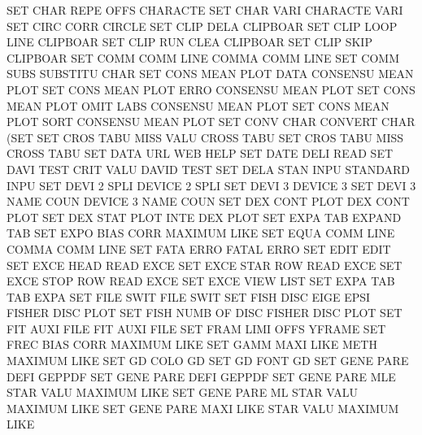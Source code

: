 SET      CHAR REPE OFFS                 CHARACTE
SET      CHAR VARI                      CHARACTE VARI
SET      CIRC CORR                      CIRCLE
SET      CLIP DELA                      CLIPBOAR
SET      CLIP LOOP LINE                 CLIPBOAR
SET      CLIP RUN  CLEA                 CLIPBOAR
SET      CLIP SKIP                      CLIPBOAR
SET      COMM COMM LINE                 COMMA    COMM LINE
SET      COMM SUBS                      SUBSTITU CHAR
SET      CONS MEAN PLOT DATA            CONSENSU MEAN PLOT
SET      CONS MEAN PLOT ERRO            CONSENSU MEAN PLOT
SET      CONS MEAN PLOT OMIT LABS       CONSENSU MEAN PLOT
SET      CONS MEAN PLOT SORT            CONSENSU MEAN PLOT
SET      CONV CHAR                      CONVERT  CHAR (SET
SET      CROS TABU MISS VALU            CROSS    TABU
SET      CROS TABU MISS                 CROSS    TABU
SET      DATA URL                       WEB      HELP
SET      DATE DELI                      READ
SET      DAVI TEST CRIT VALU            DAVID    TEST
SET      DELA STAN INPU                 STANDARD INPU
SET      DEVI 2    SPLI                 DEVICE   2    SPLI 
SET      DEVI 3                         DEVICE   3
SET      DEVI 3    NAME COUN            DEVICE   3    NAME COUN
SET      DEX  CONT PLOT                 DEX      CONT PLOT
SET      DEX  STAT PLOT INTE            DEX      PLOT
SET      EXPA TAB                       EXPAND   TAB
SET      EXPO BIAS CORR                 MAXIMUM  LIKE
SET      EQUA COMM LINE                 COMMA    COMM LINE
SET      FATA ERRO                      FATAL    ERRO
SET      EDIT                           EDIT
SET      EXCE HEAD                      READ     EXCE
SET      EXCE STAR ROW                  READ     EXCE
SET      EXCE STOP ROW                  READ     EXCE
SET      EXCE VIEW                      LIST
SET      EXPA TAB                       TAB      EXPA
SET      FILE SWIT                      FILE     SWIT
SET      FISH DISC EIGE EPSI            FISHER   DISC PLOT
SET      FISH NUMB OF   DISC            FISHER   DISC PLOT
SET      FIT  AUXI FILE                 FIT      AUXI FILE
SET      FRAM LIMI OFFS                 YFRAME
SET      FREC BIAS CORR                 MAXIMUM  LIKE
SET      GAMM MAXI LIKE METH            MAXIMUM  LIKE
SET      GD   COLO                      GD
SET      GD   FONT                      GD
SET      GENE PARE DEFI                 GEPPDF
SET      GENE PARE DEFI                 GEPPDF
SET      GENE PARE MLE  STAR VALU       MAXIMUM  LIKE
SET      GENE PARE ML   STAR VALU       MAXIMUM  LIKE
SET      GENE PARE MAXI LIKE STAR VALU  MAXIMUM  LIKE
